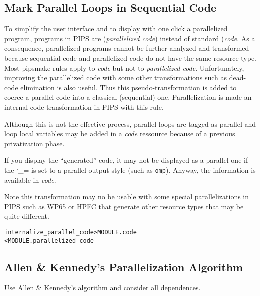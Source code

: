 \documentclass[a4paper]{report}
\makeatletter
\newenvironment{PipsMake}{\begin{alltt}}{\end{alltt}}
\def\PipsProperty{%
  \begingroup\catcode`\_=\active\@PipsProperty}
{%
  \gdef\@PipsProperty#1{\href{http://www.cri.ensmp.fr/pips/properties-rc.htdoc}{\texttt{#1}}\endgroup\xspace}}
\makeatother
\begin{document}
\subsection{Mark Parallel Loops in Sequential Code}
\label{sec:cons-parall-code}

To simplify the user interface and to display with one click a
parallelized program, programs in PIPS are ({\em parallelized code})
instead of standard ({\em code}. As a consequence, parallelized
programs cannot be further analyzed and transformed because sequential
code and parallelized code do not have the same resource type. Most
pipsmake rules apply to {\em code} but not to {\em parallelized
code}. Unfortunately, improving the parallelized code with some other
transformations such as dead-code elimination is also useful. Thus
this pseudo-transformation is added to coerce a parallel code into a
classical (sequential) one. Parallelization is made an internal code
transformation in PIPS with this rule.

Although this is not the effective process, parallel loops are tagged
as parallel and loop local variables may be added in a {\em code}
ressource because of a previous privatization phase.

If you display the ``generated'' code, it may not be displayed as a
parallel one if the \PipsProperty{PRETTYPRINT\_SEQUENTIAL\_STYLE} is set
to a parallel output style (such as \texttt{omp}). Anyway, the information
is available in {\em code}.

Note this transformation may no be usable with some special
parallelizations in PIPS such as WP65 or HPFC that generate other resource
types that may be quite different.

\begin{PipsMake}
internalize_parallel_code             > MODULE.code
        < MODULE.parallelized_code
\end{PipsMake}


\subsection{Allen \& Kennedy's Parallelization Algorithm}
\label{subsubsection-allen-kennedy-parallelization-algorithm}

Use A{\sc llen} \& K{\sc ennedy}'s algorithm and consider all
dependences.
\end{document}
